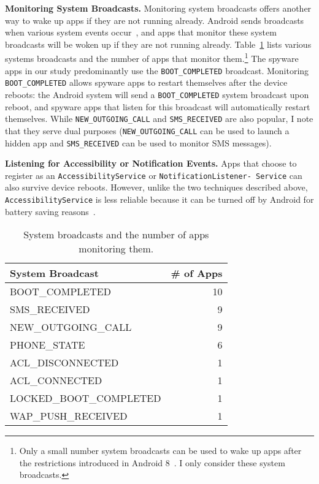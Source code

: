 \textbf{Monitoring System Broadcasts.} Monitoring system broadcasts offers another way to wake up apps if they are not running already. Android sends broadcasts when various system events occur~\cite{Broadcas25:online}, and apps that monitor these system broadcasts will be woken up if they are not running already. Table~\ref{tab:monitor_broadcast} lists various systems broadcasts and the number of apps that monitor them.\footnote{Only a small number system broadcasts can be used to wake up apps after the restrictions introduced in Android 8~\cite{Implicit72:online}. I only consider these system broadcasts.} The spyware apps in our study predominantly use the \texttt{BOOT\_COMPLETED} broadcast. Monitoring
\texttt{BOOT\_COMPLETED} allows spyware apps to restart themselves
after the device reboots: the Android system will send a
\texttt{BOOT\_COMPLETED} system broadcast upon reboot, and spyware apps that listen
for this broadcast will automatically restart themselves. While \texttt{NEW\_OUTGOING\_CALL} and \texttt{SMS\_RECEIVED} are also popular, I note that they serve dual purposes (\texttt{NEW\_OUTGOING\_CALL} can be used to launch a hidden app and \texttt{SMS\_RECEIVED} can be used to monitor SMS messages).

\textbf{Listening for Accessibility or Notification Events.} Apps that choose to register as an
\texttt{AccessibilityService} or
\texttt{NotificationListener- Service}
can also survive device
reboots. However, unlike the two techniques described above,
\texttt{AccessibilityService}
is less reliable because it can be
turned off by Android for battery saving reasons~\cite{AndroidA0:online,Accessib46:online}.


\begin{table}[t]
  \centering
  \begin{tabular}{lr}
    System Broadcast         &\# of Apps  \\
    \midrule
    BOOT\_COMPLETED          &10          \\
    SMS\_RECEIVED            &9           \\
    NEW\_OUTGOING\_CALL      &9           \\
    PHONE\_STATE             &6           \\
    ACL\_DISCONNECTED        &1           \\
    ACL\_CONNECTED           &1           \\
    LOCKED\_BOOT\_COMPLETED  &1           \\
    WAP\_PUSH\_RECEIVED      &1           \\
  \end{tabular}
  \caption{System broadcasts and the number of apps monitoring them.\label{tab:monitor_broadcast}}
\end{table}

